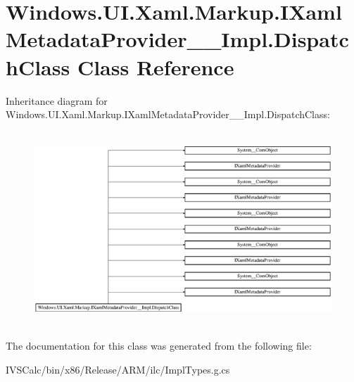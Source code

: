\hypertarget{class_windows_1_1_u_i_1_1_xaml_1_1_markup_1_1_i_xaml_metadata_provider_____impl_1_1_dispatch_class}{}\section{Windows.\+U\+I.\+Xaml.\+Markup.\+I\+Xaml\+Metadata\+Provider\+\_\+\+\_\+\+Impl.\+Dispatch\+Class Class Reference}
\label{class_windows_1_1_u_i_1_1_xaml_1_1_markup_1_1_i_xaml_metadata_provider_____impl_1_1_dispatch_class}
Inheritance diagram for Windows.\+U\+I.\+Xaml.\+Markup.\+I\+Xaml\+Metadata\+Provider\+\_\+\+\_\+\+Impl.\+Dispatch\+Class\+:\begin{figure}[H]
\begin{center}
\leavevmode
\includegraphics[height=7.333333cm]{class_windows_1_1_u_i_1_1_xaml_1_1_markup_1_1_i_xaml_metadata_provider_____impl_1_1_dispatch_class}
\end{center}
\end{figure}


The documentation for this class was generated from the following file\+:\begin{DoxyCompactItemize}
\item 
I\+V\+S\+Calc/bin/x86/\+Release/\+A\+R\+M/ilc/Impl\+Types.\+g.\+cs\end{DoxyCompactItemize}
